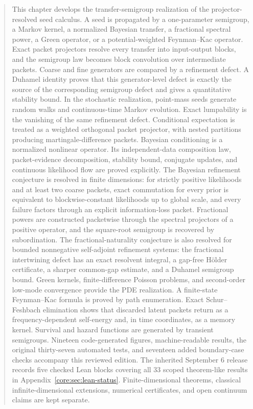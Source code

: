 \documentclass[11pt,letterpaper]{article}
\theoremstyle{plain}
\theoremstyle{plain}
\theoremstyle{plain}
\theoremstyle{definition}
\theoremstyle{definition}
\theoremstyle{definition}
\theoremstyle{definition}
\theoremstyle{definition}
\theoremstyle{remark}
\theoremstyle{remark}
\theoremstyle{remark}
\theoremstyle{remark}
\theoremstyle{remark}
\theoremstyle{remark}
\begin{document}
\begin{abstract}
This chapter develops the transfer-semigroup realization of the projector-resolved seed calculus. A seed is propagated by a one-parameter semigroup, a Markov kernel, a normalized Bayesian transfer, a fractional spectral power, a Green operator, or a potential-weighted Feynman--Kac operator. Exact packet projectors resolve every transfer into input-output blocks, and the semigroup law becomes block convolution over intermediate packets. Coarse and fine generators are compared by a refinement defect. A Duhamel identity proves that this generator-level defect is exactly the source of the corresponding semigroup defect and gives a quantitative stability bound. In the stochastic realization, point-mass seeds generate random walks and continuous-time Markov evolution. Exact lumpability is the vanishing of the same refinement defect. Conditional expectation is treated as a weighted orthogonal packet projector, with nested partitions producing martingale-difference packets. Bayesian conditioning is a normalized nonlinear operator. Its independent-data composition law, packet-evidence decomposition, stability bound, conjugate updates, and continuous likelihood flow are proved explicitly.  The Bayesian refinement conjecture is resolved in finite dimensions: for strictly positive likelihoods and at least two coarse packets, exact commutation for every prior is equivalent to blockwise-constant likelihoods up to global scale, and every failure factors through an explicit information-loss packet. Fractional powers are constructed packetwise through the spectral projectors of a positive operator, and the square-root semigroup is recovered by subordination. The fractional-naturality conjecture is also resolved for bounded nonnegative self-adjoint refinement systems: the fractional intertwining defect has an exact resolvent integral, a gap-free Hölder certificate, a sharper common-gap estimate, and a Duhamel semigroup bound. Green kernels, finite-difference Poisson problems, and second-order low-mode convergence provide the PDE realization. A finite-state Feynman--Kac formula is proved by path enumeration. Exact Schur--Feshbach elimination shows that discarded latent packets return as a frequency-dependent self-energy and, in time coordinates, as a memory kernel. Survival and hazard functions are generated by transient semigroups. Nineteen code-generated figures, machine-readable results, the original thirty-seven automated tests, and seventeen added boundary-case checks accompany this reviewed edition. The inherited September 6 release records five checked Lean blocks covering all 33 scoped theorem-like results in Appendix~\ref{core:sec:lean-status}. Finite-dimensional theorems, classical infinite-dimensional extensions, numerical certificates, and open continuum claims are kept separate.
\end{abstract}
\end{document}
